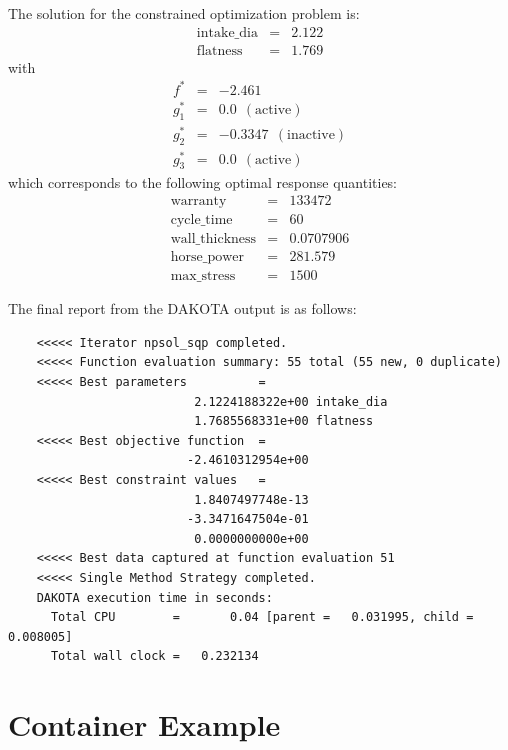 The solution for the constrained optimization problem is:
\begin{eqnarray*}
    \mathrm{intake\_dia} &=& 2.122 \\
    \mathrm{flatness}    &=& 1.769
\end{eqnarray*}
with
\begin{eqnarray*}
      f^{\ast} &=& -2.461 \\
    g_1^{\ast} &=&  0.0    ~~\mathrm{(active)} \\
    g_2^{\ast} &=& -0.3347 ~~\mathrm{(inactive)} \\
    g_3^{\ast} &=&  0.0    ~~\mathrm{(active)}
\end{eqnarray*}
which corresponds to the following optimal response quantities:
\begin{eqnarray*}
    \mathrm{warranty}        &=& 133472 \\
    \mathrm{cycle\_time}     &=& 60 \\
    \mathrm{wall\_thickness} &=& 0.0707906 \\
    \mathrm{horse\_power}    &=& 281.579 \\
    \mathrm{max\_stress}     &=& 1500
\end{eqnarray*}

The final report from the DAKOTA output is as follows:
\begin{small}
\begin{verbatim}
    <<<<< Iterator npsol_sqp completed.					 
    <<<<< Function evaluation summary: 55 total (55 new, 0 duplicate)	 
    <<<<< Best parameters          =					 
                          2.1224188322e+00 intake_dia			 
                          1.7685568331e+00 flatness
    <<<<< Best objective function  =					 
                         -2.4610312954e+00
    <<<<< Best constraint values   =		 
                          1.8407497748e-13
                         -3.3471647504e-01
                          0.0000000000e+00
    <<<<< Best data captured at function evaluation 51
    <<<<< Single Method Strategy completed.
    DAKOTA execution time in seconds:					 
      Total CPU        =       0.04 [parent =   0.031995, child =   0.008005]
      Total wall clock =   0.232134
\end{verbatim}
\end{small}

\section{Container Example}\label{additional:container}

